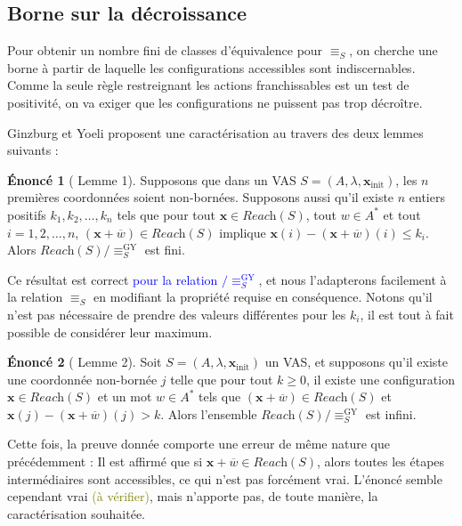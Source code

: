 \documentclass[a4paper,final]{article}
\theoremstyle{definition}
\newtheorem*{Statement}{Énoncé}
\let\leq\leqslant
\let\geq\geqslant
\newcommand{\alain}[1]{\textcolor{blue}{#1}}
\newcommand{\lucas}[1]{\textcolor{olive}{#1}}
\newcommand{\lang}{\ensuremath{\mathcal{L}}}
\newcommand{\reach}{\ensuremath{\textit{Reach}}}
\newcommand{\vect}[1]{\ensuremath{\mathbf{#1}}}
\newcommand{\rel}{\ensuremath{\equiv}}
\newcommand{\relGY}{\ensuremath{\equiv^\text{GY}_S}}
\newcommand{\xinit}{\ensuremath{\vect{x}_\text{init}}}
\newcommand{\valeur}[1]{\ensuremath{\overline{#1}}}
\begin{document}

\subsection{Borne sur la décroissance}

Pour obtenir un nombre fini de classes d'équivalence pour $\rel_S$, on cherche une borne à partir de laquelle les configurations accessibles sont indiscernables.
Comme la seule règle restreignant les actions franchissables est un test de positivité, on va exiger que les configurations ne puissent pas trop décroître.

Ginzburg et Yoeli proposent une caractérisation au travers des deux lemmes suivants :


\begin{Statement}[\cite{giyo80} Lemme 1]
    Supposons que dans un VAS $S=(A,\lambda,\xinit)$, les $n$ premières coordonnées soient non-bornées.
    Supposons aussi qu'il existe $n$ entiers positifs $k_1,k_2,\dots,k_n$ tels que pour tout $\vect{x}\in\reach(S)$, tout $w\in A^\ast$ et tout $i=1,2,\dots,n$, 
    $(\vect{x} +\valeur{w})\in\reach(S)$ implique
    $\vect{x}(i) - (\vect{x} +\valeur{w})(i) \leq k_i$.
    Alors $\reach(S)/\relGY$ est fini.
\end{Statement}

Ce résultat est correct \alain{pour la relation $/\relGY$}, et nous l'adapterons facilement à la relation $\rel_S$ en modifiant la propriété requise en conséquence.
Notons qu'il n'est pas nécessaire de prendre des valeurs différentes pour les $k_i$, il est tout à fait possible de considérer leur maximum.

\begin{Statement}[\cite{giyo80} Lemme 2]
    Soit $S=(A,\lambda,\xinit)$ un VAS, et supposons qu'il existe une coordonnée non-bornée $j$ telle que 
    pour tout $k\geq 0$, il existe une configuration $\vect{x}\in\reach(S)$ et un mot $w\in A^\ast$ tels que 
    $(\vect{x} +\valeur{w}) \in\reach(S)$ et $\vect{x}(j) - (\vect{x} +\valeur{w})(j) > k$.
    Alors l'ensemble $\reach(S)/\relGY$ est infini.
\end{Statement}

Cette fois, la preuve donnée comporte une erreur de même nature que précédemment :
Il est affirmé que si $\vect{x} +\valeur{w} \in\reach(S)$, alors toutes les étapes intermédiaires sont accessibles, ce qui n'est pas forcément vrai.
L'énoncé semble cependant vrai \lucas{(à vérifier)}, mais n'apporte pas, de toute manière, la caractérisation souhaitée.
\end{document}
